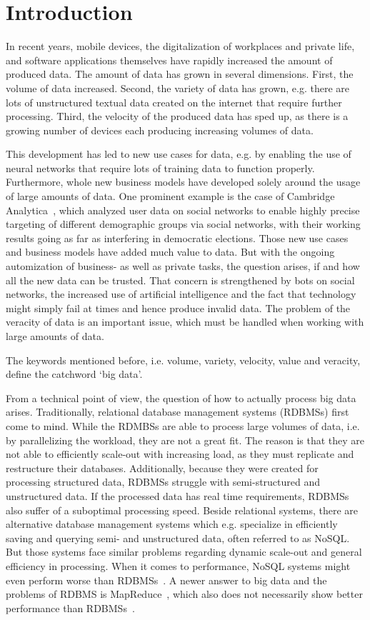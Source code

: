\section{Introduction}\label{introduction}
In recent years, mobile devices, the digitalization of workplaces and private life, and software applications themselves have rapidly increased the amount of produced data. The amount of data has grown in several dimensions. First, the volume of data increased. Second, the variety of data has grown, e.g. there are lots of unstructured textual data created on the internet that require further processing. Third, the velocity of the produced data has sped up, as there is a growing number of devices each producing increasing volumes of data.

This development has led to new use cases for data, e.g. by enabling the use of neural networks that require lots of training data to function properly. Furthermore, whole new business models have developed solely around the usage of large amounts of data. One prominent example is the case of Cambridge Analytica~\cite{CAWashingtonPost, CANetzpolitik}, which analyzed user data on social networks to enable highly precise targeting of different demographic groups via social networks, with their working results going as far as interfering in democratic elections. Those new use cases and business models have added much value to data. But with the ongoing automization of business- as well as private tasks, the question arises, if and how all the new data can be trusted. That concern is strengthened by bots on social networks, the increased use of artificial intelligence and the fact that technology might simply fail at times and hence produce invalid data. The problem of the veracity of data is an important issue, which must be handled when working with large amounts of data.

The keywords mentioned before, i.e. volume, variety, velocity, value and veracity, define the catchword ‘big data’.

From a technical point of view, the question of how to actually process big data arises. Traditionally, relational database management systems (RDBMSs) first come to mind. While the RDMBSs are able to process large volumes of data, i.e. by parallelizing the workload, they are not a great fit. The reason is that they are not able to efficiently scale-out with increasing load, as they must replicate and restructure their databases. Additionally, because they were created for processing structured data, RDBMSs struggle with semi-structured and unstructured data. If the processed data has real time requirements, RDBMSs also suffer of a suboptimal processing speed. Beside relational systems, there are alternative database management systems which e.g. specialize in efficiently saving and querying semi- and unstructured data, often referred to as NoSQL. But those systems face similar problems regarding dynamic scale-out and general efficiency in processing. When it comes to performance, NoSQL systems might even perform worse than RDBMSs~\cite{NoSQLElephants}. A newer answer to big data and the problems of RDBMS is MapReduce~\cite{MapReduce}, which also does not necessarily show better performance than RDBMSs~\cite{RDBMSvsMapReduce}.

